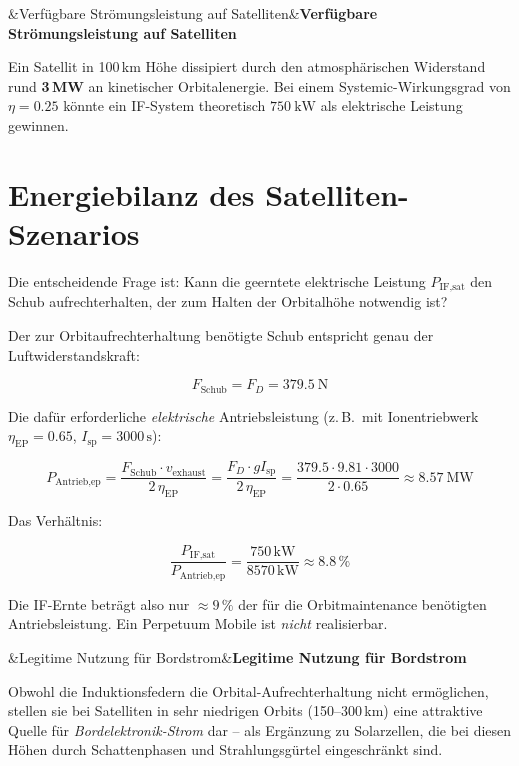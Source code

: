 ﻿\documentclass[12pt, a4paper]{report}
\newenvironment{ergebnis}[1][]{%
  \begin{ergebnisframe}\sloppy%
  \ifx&#1&\else\textbf{#1}\par\smallskip\fi}{\end{ergebnisframe}}
\theoremstyle{definition}
\theoremstyle{remark}
\begin{document}
\begin{ergebnis}[Verfügbare Strömungsleistung auf Satelliten]
  Ein Satellit in 100\,km Höhe dissipiert durch den atmosphärischen Widerstand
  rund \textbf{3\,MW} an kinetischer Orbitalenergie. Bei einem Systemic-Wirkungsgrad
  von $\eta = 0.25$ könnte ein IF-System theoretisch $\SI{750}{\kilo\watt}$
  als elektrische Leistung gewinnen.
\end{ergebnis}

\section{Energiebilanz des Satelliten-Szenarios}

Die entscheidende Frage ist: Kann die geerntete elektrische Leistung $P_{\text{IF,sat}}$
den Schub aufrechterhalten, der zum Halten der Orbitalhöhe notwendig ist?

Der zur Orbit\-aufrechterhaltung benötigte Schub entspricht genau der
Luftwiderstandskraft:

\begin{equation}
  F_{\text{Schub}} = F_D = \SI{379.5}{\newton}
  \label{eq:f_schub}
\end{equation}

Die dafür erforderliche \emph{elektrische} Antriebsleistung (z.\,B.\ mit
Ionen\-triebwerk $\eta_{\text{EP}} = 0.65$, $I_{\text{sp}} = 3000\,\text{s}$):

\begin{equation}
  P_{\text{Antrieb,ep}} = \frac{F_{\text{Schub}} \cdot v_{\text{exhaust}}}{2\,\eta_{\text{EP}}}
  = \frac{F_D \cdot g I_{\text{sp}}}{2\,\eta_{\text{EP}}}
  = \frac{379.5 \cdot 9.81 \cdot 3000}{2 \cdot 0.65}
  \approx \SI{8.57}{\mega\watt}
  \label{eq:p_antrieb_ep}
\end{equation}

Das Verhältnis:

\begin{equation}
  \frac{P_{\text{IF,sat}}}{P_{\text{Antrieb,ep}}} = \frac{750\,\text{kW}}{8570\,\text{kW}} \approx 8.8\,\%
  \label{eq:ratio_sat}
\end{equation}

Die IF-Ernte beträgt also nur $\approx 9\,\%$ der für die Orbitmaintenance
benötigten Antriebsleistung. Ein Perpetuum Mobile ist \emph{nicht} realisierbar.

\begin{ergebnis}[Legitime Nutzung für Bordstrom]
  Obwohl die Induktionsfedern die Orbital-Aufrechterhaltung nicht ermöglichen,
  stellen sie bei Satelliten in sehr niedrigen Orbits (150--300\,km) eine
  attraktive Quelle für \emph{Bordelektronik-Strom} dar -- als Ergänzung zu
  Solar\-zellen, die bei diesen Höhen durch Schattenphasen und Strahlungsgürtel
  eingeschränkt sind.
\end{ergebnis}
\end{document}
